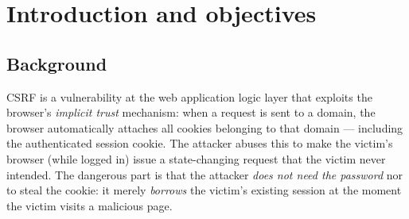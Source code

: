 \documentclass[11pt,a4paper]{article}
\begin{document}
\begin{abstract}
\noindent This report presents the study and hands-on experiment of a \textbf{Cross-Site Request Forgery (CSRF)} attack against the open-source social-networking application \textbf{Elgg}. The improvement over the original lab is to fully replace \texttt{XMLHttpRequest} and the \texttt{form submit} mechanism with the modern \textbf{Fetch API} combined with \texttt{URLSearchParams} or \texttt{FormData}. The exploitation goal is to change the victim's \emph{About me} profile field to the string \texttt{CSRF attack by <ID>}.

Unlike many reports that stop at description, the team actually \textbf{built and ran} a local Docker lab (Elgg \textbf{3.3.3}, loopback-isolated), captured \textbf{real screenshots} from the Chrome browser and verified results at both the UI and the HTTP layers. The report analyses the HTTP packet, explains the core mechanisms (\texttt{credentials: 'include'}, Simple Request, \texttt{mode: 'no-cors'}), illustrates the attack-flow diagram, reports a \textbf{technical finding} about how Elgg stores a profile field (annotation vs.\ metadata), and — most importantly — \textbf{proves experimentally} the effectiveness of two independent defense layers: the \emph{anti-CSRF token} and the \emph{SameSite cookie}. The report ends with answers to 15 theory questions, a reproduction procedure and an AI-usage disclosure.
\end{abstract}

{\hypersetup{linkcolor=ink}\tableofcontents}
\newpage

\section{Introduction and objectives}
\subsection{Background}
CSRF is a vulnerability at the web application logic layer that exploits the browser's \emph{implicit trust} mechanism: when a request is sent to a domain, the browser automatically attaches all cookies belonging to that domain — including the authenticated session cookie. The attacker abuses this to make the victim's browser (while logged in) issue a state-changing request that the victim never intended. The dangerous part is that the attacker \emph{does not need the password} nor to steal the cookie: it merely \emph{borrows} the victim's existing session at the moment the victim visits a malicious page.
\end{document}
